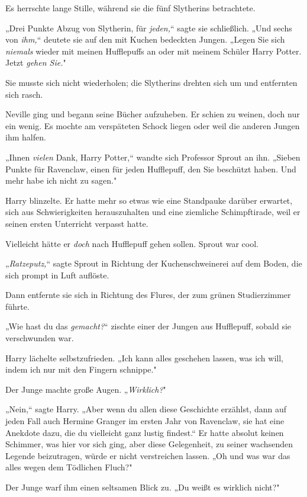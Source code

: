 {Es herrschte lange Stille, während sie die fünf Slytherins betrachtete.

„Drei Punkte Abzug von Slytherin, für \emph{jeden,}“ sagte sie schließlich. „Und sechs von \emph{ihm,}“ deutete sie auf den mit Kuchen bedeckten Jungen. „Legen Sie sich \emph{niemals} wieder mit meinen Hufflepuffs an oder mit meinem Schüler Harry Potter. Jetzt \emph{gehen Sie.}"

Sie musste sich nicht wiederholen; die Slytherins drehten sich um und entfernten sich rasch.

Neville ging und begann seine Bücher aufzuheben. Er schien zu weinen, doch nur ein wenig. Es mochte am verspäteten Schock liegen oder weil die anderen Jungen ihm halfen.

„Ihnen \emph{vielen} Dank, Harry Potter,“ wandte sich Professor Sprout an ihn. „Sieben Punkte für Ravenclaw, einen für jeden Hufflepuff, den Sie beschützt haben. Und mehr habe ich nicht zu sagen."

Harry blinzelte. Er hatte mehr so etwas wie eine Standpauke darüber erwartet, sich aus Schwierigkeiten herauszuhalten und eine ziemliche Schimpftirade, weil er seinen ersten Unterricht verpasst hatte.

Vielleicht hätte er \emph{doch} nach Hufflepuff gehen sollen. Sprout war cool.

„\emph{Ratzeputz,}“ sagte Sprout in Richtung der Kuchenschweinerei auf dem Boden, die sich prompt in Luft auflöste.

Dann entfernte sie sich in Richtung des Flures, der zum grünen Studierzimmer führte.

„Wie hast du das \emph{gemacht?}“ zischte einer der Jungen aus Hufflepuff, sobald sie verschwunden war.

Harry lächelte selbstzufrieden. „Ich kann alles geschehen lassen, was ich will, indem ich nur mit den Fingern schnippe."

Der Junge machte große Augen. „\emph{Wirklich?}"

„Nein,“ sagte Harry. „Aber wenn du allen diese Geschichte erzählst, dann auf jeden Fall auch Hermine Granger im ersten Jahr von Ravenclaw, sie hat eine Anekdote dazu, die du vielleicht ganz lustig findest.“ Er hatte absolut keinen Schimmer, was hier vor sich ging, aber diese Gelegenheit, zu seiner wachsenden Legende beizutragen, würde er nicht verstreichen lassen. „Oh und was war das alles wegen dem Tödlichen Fluch?"

Der Junge warf ihm einen seltsamen Blick zu. „Du weißt es wirklich nicht?"

}

